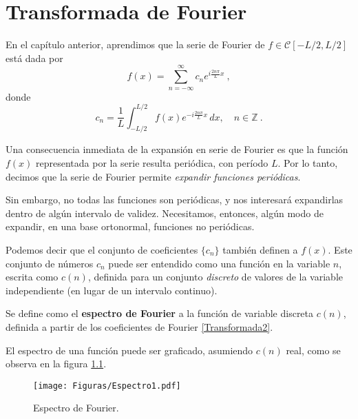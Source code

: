 \chapter{Transformada de Fourier}


En el capítulo anterior, aprendimos que la serie de Fourier de $f \in \mathscr{C}[-L/2,L/2]$ está dada por 
\begin{equation} \label{Transformada1}
  f(x) = \sum_{n=-\infty}^{\infty} c_n e^{i \frac{2n\pi}{L}x} \ ,  
\end{equation}
donde 
\begin{equation} \label{Transformada2}
  c_n = \frac{1}{L} \int_{-L/2}^{L/2} f(x) e^{-i\frac{2n\pi}{L}x} \,dx, \quad n \in \mathbb{Z} \ . 
\end{equation}

Una consecuencia inmediata de la expansión en serie de Fourier es que la función $f(x)$ representada por la serie resulta periódica, con período $L$. Por lo tanto, decimos que la serie de Fourier permite \emph{expandir funciones periódicas}. 

Sin embargo, no todas las funciones son periódicas, y nos interesará expandirlas dentro de algún intervalo de validez. Necesitamos, entonces, algún modo de expandir, en una base ortonormal, funciones no periódicas. 

Podemos decir que el conjunto de coeficientes $\{c_n\}$ también definen a $f(x)$. Este conjunto de números $c_n$ puede ser entendido como una función en la variable $n$, escrita como $c(n)$, definida para un conjunto \emph{discreto} de valores de la variable independiente (en lugar de un intervalo continuo).  
\begin{defi}
    Se define como el \textbf{espectro de Fourier} a la función de variable discreta $c(n)$, definida a partir de los coeficientes de Fourier \eqref{Transformada2}.
\end{defi}

El espectro de una función puede ser graficado, asumiendo $c(n)$ real, como se observa en la figura \ref{fig:espectro-fourier}.

\vspace{-0.5cm}
\begin{figure}[H]
    \centering
    \texttt{[image: Figuras/Espectro1.pdf]}
    \caption{Espectro de Fourier.}
    \label{fig:espectro-fourier}
\end{figure}

